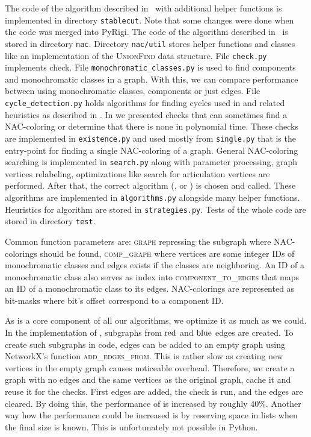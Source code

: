 The code of the algorithm described in~
with additional helper functions is implemented in directory \texttt{stablecut}.
Note that some changes were done when the code was merged into PyRigi.
The code of the algorithm described in~
is stored in directory \texttt{nac}.
Directory \texttt{nac/util} stores helper functions and classes
like an implementation of the \textsc{UnionFind} data structure.
File \texttt{check.py} implements \IsNACColoring{} check.
File \texttt{monochromatic\_classes.py} is used to find \trcon{} components
and monochromatic classes in a graph. With this, we can compare performance
between using monochromatic classes, \trcon{} components or just edges.
File \texttt{cycle\_detection.py} holds algorithms for finding cycles
used in 
and related heuristics as described in .
In 
we presented checks that can sometimes find
a NAC-coloring or determine that there is none in polynomial time.
These checks are implemented in \texttt{existence.py} and
used mostly from \texttt{single.py} that is the entry-point for finding a single NAC-coloring of a graph.
General NAC-coloring searching is implemented in \texttt{search.py}
along with parameter processing, graph vertices relabeling,
optimizations like search for articulation vertices are performed.
After that, the correct algorithm (\Naive{}, \NaiveCycles{} or \Subgraphs{})
is chosen and called.
These algorithms are implemented in \texttt{algorithms.py} alongside many helper functions.
Heuristics for \Subgraphs{} algorithm are stored in \texttt{strategies.py}.
Tests of the whole code are stored in directory \texttt{test}.

Common function parameters are:
\textsc{graph} repressing the subgraph where NAC-colorings should be found,
\textsc{comp\_graph} where vertices are some integer IDs of monochromatic classes
and edges exists if the classes are neighboring.
An ID of a monochromatic class also serves as index into \textsc{component\_to\_edges}
that maps an ID of a monochromatic class to its edges.
NAC-colorings are represented as bit-masks where bit's offset correspond to a component ID\@.

As \IsNACColoring{} is a core component of all our algorithms, we optimize it as much as we could.
In the implementation of \IsNACColoring{}, subgraphs from \( \text{red} \) and \( \text{blue} \) edges are created.
To create such subgraphs in code, edges can be added to an empty graph
using NetworkX's function \textsc{add\_edges\_from}.
This is rather slow as creating new vertices in the empty graph causes noticeable overhead.
Therefore, we create a graph with no edges and the same vertices as the original graph,
cache it and reuse it for the checks. First edges are added, the check is run, and the edges are cleared.
By doing this, the performance of \IsNACColoring{} is increased by roughly 40\%.
Another way how the performance could be increased is by reserving space in lists
when the final size is known. This is unfortunately not possible in Python.

